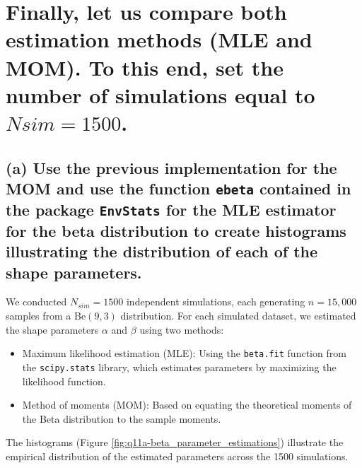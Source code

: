 \newpage

\section{Finally, let us compare both estimation methods (MLE and MOM). To this end, set the number of simulations equal to $Nsim = 1500$.}



\subsection*{(a) Use the previous implementation for the MOM and use the function \texttt{ebeta} contained in the package \texttt{EnvStats} for the MLE estimator for the beta distribution to create histograms illustrating the distribution of each of the shape parameters.}

We conducted \(N_{sim} = 1500\) independent simulations, each generating \(n = 15,\!000\) samples from a \(\text{Be}(9, 3)\) distribution. For each simulated dataset, we estimated the shape parameters \(\alpha\) and \(\beta\) using two methods:

\begin{itemize}
    \item Maximum likelihood estimation (MLE): Using the \texttt{beta.fit} function from the \texttt{scipy.stats} library, which estimates parameters by maximizing the likelihood function.
    \item Method of moments (MOM): Based on equating the theoretical moments of the Beta distribution to the sample moments.
\end{itemize}

\vspace{0.5em}
The histograms (Figure \ref{fig:q11a-beta_parameter_estimations}) illustrate the empirical distribution of the estimated parameters across the 1500 simulations.

